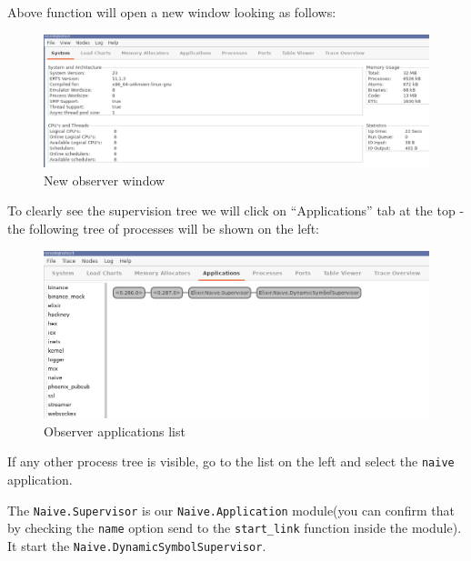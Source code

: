 \documentclass[
  oneside]{book}
\newenvironment{Shaded}{\begin{snugshade}}{\end{snugshade}}
\newcommand{\AttributeTok}[1]{\textcolor[rgb]{0.77,0.63,0.00}{#1}}
\newcommand{\ErrorTok}[1]{\textcolor[rgb]{0.64,0.00,0.00}{\textbf{#1}}}
\newcommand{\ExtensionTok}[1]{#1}
\newcommand{\KeywordTok}[1]{\textcolor[rgb]{0.13,0.29,0.53}{\textbf{#1}}}
\newcommand{\NormalTok}[1]{#1}
\newcommand{\OperatorTok}[1]{\textcolor[rgb]{0.81,0.36,0.00}{\textbf{#1}}}
\begin{document}
\begin{Shaded}
\end{Shaded}

Above function will open a new window looking as follows:

\begin{figure}
\centering
\includegraphics{images/chapter_05_06_new_observer.png}
\caption{New observer window}
\end{figure}

To clearly see the supervision tree we will click on ``Applications'' tab at the top - the following tree of processes will be shown on the left:

\begin{figure}
\centering
\includegraphics{images/chapter_05_07_observer_app_list.png}
\caption{Observer applications list}
\end{figure}

If any other process tree is visible, go to the list on the left and select the \texttt{naive} application.

The \texttt{Naive.Supervisor} is our \texttt{Naive.Application} module(you can confirm that by checking the \texttt{name} option send to the \texttt{start\_link} function inside the module). It start the \texttt{Naive.DynamicSymbolSupervisor}.
\end{document}
